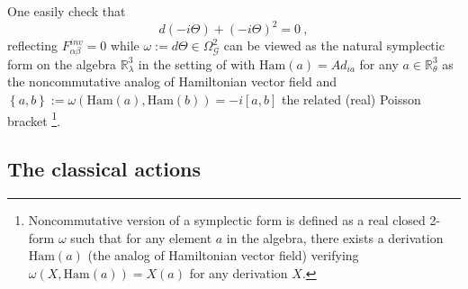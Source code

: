 \documentclass[a4paper,11pt,twoside]{article}
\numberwithin{equation}{section}
\newcommand\ham{{\text{Ham}}}
\theoremstyle{nonumberplain}
\newcounter{and}
\begin{document}
%
One easily check that%
%
\begin{equation*}
d(-i\Theta)+(-i\Theta)^2=0 \ ,
\end{equation*}
%
reflecting $F^{inv}_{\alpha\beta}=0$ while $\omega:=d\Theta\in\Omega^2_\mathcal{G}$ can be viewed as the natural symplectic form on the algebra $\mathbb{R}^3_\lambda$ in the setting of \cite{mdv88-99} with $\ham(a)=Ad_{ia}$ for any $a\in\mathbb{R}^3_\theta$ as the noncommutative analog of Hamiltonian vector field and $\left\{a,b\right\}:=\omega\left(\ham(a),\ham(b)\right)=-i\left[a,b\right]$ the related (real) Poisson bracket {\footnote{Noncommutative version of a symplectic form is defined as a real closed 2-form $\omega$ such that for any element $a$ in the algebra, there exists a derivation $\ham(a)$ (the analog of Hamiltonian vector field) verifying $\omega(X,\ham(a))=X(a)$ for any derivation $X$.}}.\par

\subsection{The classical actions}
\end{document}
